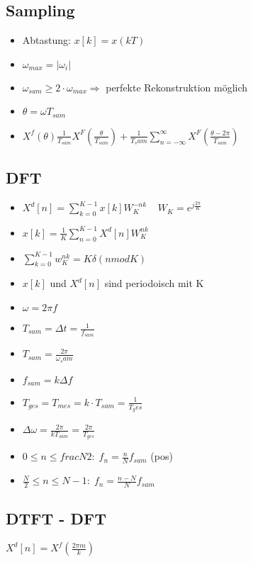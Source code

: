 \documentclass{article}
\begin{document}
\subsection{Sampling}
\begin{itemize}
\item Abtastung: $x[k] = x(kT)$
\item $\omega_{max} = |\omega_i|$
\item $\omega_{sam} \geq 2\cdot \omega_{max} \Rightarrow$ perfekte Rekonstruktion möglich
\item $\theta = \omega T_{sam}$
\item $X^f(\theta) \frac{1}{T_{sam}} X^F(\frac{\theta}{T_{sam}}) + \frac{1}{T_sam} \sum_{n=-\infty}^\infty X^F(\frac{\theta-2\pi}{T_{sam}})$
\end{itemize}

\subsection{DFT}
\begin{itemize}
\item $X^d[n] = \sum_{k=0}^{K-1}x[k]W_K^{-nk} \; \; \; \; W_K=e^{j\frac{2\pi}{K}}$
\item $x[k] = \frac{1}{K} \sum_{n= 0}^{K-1} X^d[n]W_K^{nk}$
\item $\sum_{k=0}^{K-1} w_K^{nk} = K\delta(n mod K)$
\item $x[k]$ und $X^d[n]$ sind periodoisch mit K
\end{itemize}

\begin{itemize}
\item $\omega = 2\pi f $
\item $T_{sam} = \Delta t = \frac{1}{f_{sam}}$
\item $T_{sam}=\frac{2\pi}{\omega_sam}$
\item $f_{sam} = k \Delta f$
\item $T_{ges} = T_{mes} = k\cdot T_{sam} = \frac{1}{T_ges}$
\item $\Delta \omega = \frac{2\pi}{k T_{sam}} = \frac{2\pi}{T_{ges}}$
\item $0 \leq n \leq frac{N}{2}: \; f_n = \frac{n}{N} f_{sam}$ (pos)
\item $\frac{N}{2} \leq n \leq N-1:\; f_n= \frac{n-N}{N} f_{sam} $
\end{itemize}

\subsection{DTFT - DFT}
$X^d[n]= X^f(\frac{2\pi m}{k})$
\end{document}
